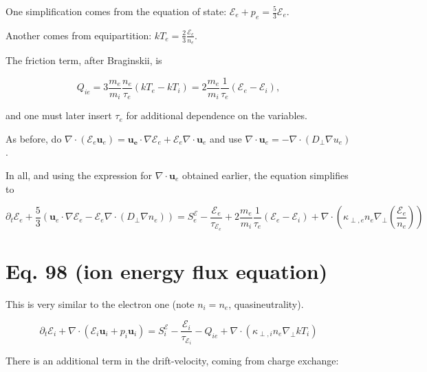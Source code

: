 \documentclass[11pt]{article}
\newcommand{\mbf}{\mathbf}
\begin{document}
One simplification comes from the equation of state: $\mathcal{E}_e + p_e = \frac{5}{3} \mathcal{E}_e$.

Another comes from equipartition: $k T_e = \frac{2}{3} \frac{\mathcal{E}_e}{n_e}$. 

The friction term, after Braginskii, is

\begin{equation}
Q_{ie} = 3 \frac{m_e}{m_i} \frac{n_e}{\tau_e} (k T_e - kT_i) = 2 \frac{m_e}{m_i} \frac{1}{\tau_e} (\mathcal{E}_e-\mathcal{E}_i),
\end{equation}

and one must later insert $\tau_e$ for additional dependence on the variables.

As before, do $\nabla \cdot (\mathcal{E}_e \mbf{u}_e ) = \mbf{u_e} \cdot \nabla \mathcal{E}_e + \mathcal{E}_e \nabla \cdot \mbf{u}_e$ and use $\nabla \cdot \mbf{u}_e = - \nabla \cdot (D_{\perp} \nabla u_e)$.

In all, and using the expression for $\nabla \cdot \mbf{u}_e$ obtained earlier, the equation simplifies to

\begin{equation}
\partial_t \mathcal{E}_e+\frac{5}{3} \left ( \mbf{u}_e \cdot \nabla \mathcal{E}_e - \mathcal{E}_e \nabla \cdot (D_{\perp} \nabla n_e) \right ) = S_e^{\mathcal{E}}-\frac{\mathcal{E}_e}{\tau_{\mathcal{E}_e}}+2 \frac{m_e}{m_i} \frac{1}{\tau_e} (\mathcal{E}_e-\mathcal{E}_i) +\nabla \cdot(\kappa_{\perp,e} n_e \nabla_{\perp} \left (\frac{\mathcal{E}_e}{n_e} \right ))
\end{equation}


\section{Eq. 98 (ion energy flux equation)}

This is very similar to the electron one (note $n_i=n_e$, quasineutrality).

\begin{equation}
\partial_t \mathcal{E}_i+\nabla \cdot (\mathcal{E}_i \mbf{u}_i+ p_i \mbf{u}_i) = S_i^{\mathcal{E}}-\frac{\mathcal{E}_i}{\tau_{\mathcal{E}_i}}-Q_{ie}+\nabla \cdot(\kappa_{\perp,i} n_e \nabla_{\perp} k T_i)
\end{equation}

There is an additional term in the drift-velocity, coming from charge exchange:
\end{document}
